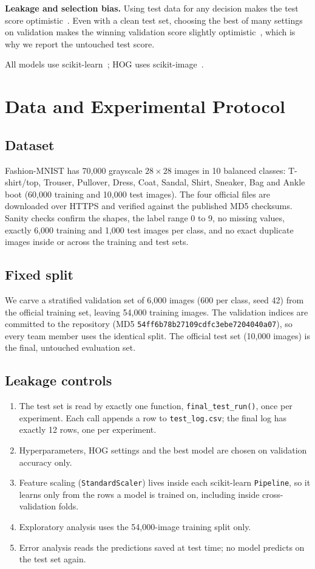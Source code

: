 \documentclass[conference]{IEEEtran}
\begin{document}
\textbf{Leakage and selection bias.} Using test data for any decision makes the test score optimistic~\cite{kaufman2012leakage}.
Even with a clean test set, choosing the best of many settings on validation makes the winning validation score slightly
optimistic~\cite{cawley2010overfitting}, which is why we report the untouched test score.

All models use scikit-learn~\cite{pedregosa2011scikit}; HOG uses scikit-image~\cite{vanderwalt2014scikit}.

\section{Data and Experimental Protocol}
\subsection{Dataset}
Fashion-MNIST has 70,000 grayscale $28\times28$ images in 10 balanced classes: T-shirt/top, Trouser, Pullover, Dress,
Coat, Sandal, Shirt, Sneaker, Bag and Ankle boot (60,000 training and 10,000 test images). The four official files are
downloaded over HTTPS and verified against the published MD5 checksums. Sanity checks confirm the shapes, the label range
0 to 9, no missing values, exactly 6,000 training and 1,000 test images per class, and no exact duplicate images inside or
across the training and test sets.

\subsection{Fixed split}
We carve a stratified validation set of 6,000 images (600 per class, seed 42) from the official training set, leaving
54,000 training images. The validation indices are committed to the repository (MD5
\texttt{54ff6b78b27109cdfc3ebe7204040a07}), so every team member uses the identical split. The official test set
(10,000 images) is the final, untouched evaluation set.

\subsection{Leakage controls}
\begin{enumerate}
  \item The test set is read by exactly one function, \texttt{final\_test\_run()}, once per experiment. Each call appends a
        row to \texttt{test\_log.csv}; the final log has exactly 12 rows, one per experiment.
  \item Hyperparameters, HOG settings and the best model are chosen on validation accuracy only.
  \item Feature scaling (\texttt{StandardScaler}) lives inside each scikit-learn \texttt{Pipeline}, so it learns only from
        the rows a model is trained on, including inside cross-validation folds.
  \item Exploratory analysis uses the 54,000-image training split only.
  \item Error analysis reads the predictions saved at test time; no model predicts on the test set again.
\end{enumerate}
\end{document}
